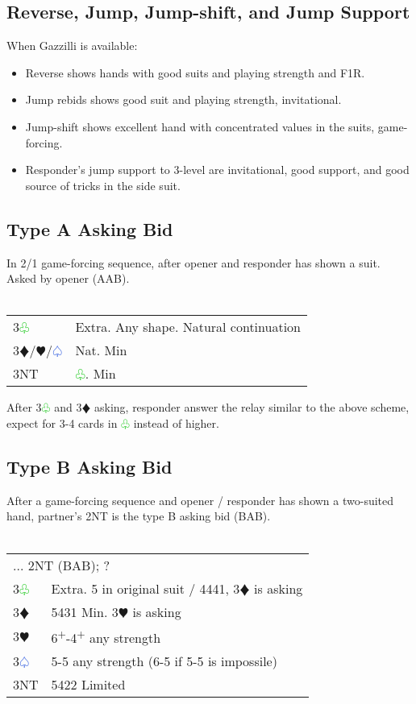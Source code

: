 \documentclass{article}
\renewcommand{\sp}{\textcolor{RoyalBlue}{$\varspade$}}
\newcommand{\he}{\textcolor{RubineRed}{$\varheart$}}
\newcommand{\di}{\textcolor{Peach}{$\vardiamond$}}
\newcommand{\cl}{\textcolor{LimeGreen}{$\varclub$}}
\newcommand{\nt}{\relsize{-1}NT\relsize{1}}
\newcommand{\up}{\textsuperscript{+}}
\begin{document}
\subsection{Reverse, Jump, Jump-shift, and Jump Support}
When Gazzilli is available: 
\begin{itemize}
    \itemsep0em
    \item Reverse shows hands with good suits and playing strength and F1R.
    \item Jump rebids shows good suit and playing strength, invitational.
    \item Jump-shift shows excellent hand with concentrated values in the suits, game-forcing.
    \item Responder's jump support to 3-level are invitational, good support, and good source of tricks in the side suit.
\end{itemize}

\subsection{Type A Asking Bid}
In 2/1 game-forcing sequence, after opener and responder has shown a suit. Asked by opener (AAB). \\\\
\begin{tabular}{|l|p{6.5cm}}
	3\cl{} & Extra. Any shape. Natural continuation \\
	3\di{}/\he{}/\sp{} & Nat. Min \\
	3\nt{} & \cl{}. Min \\
\end{tabular}

\medskip

After 3\cl{} and 3\di{} asking, responder answer the relay similar to the above scheme, expect for 3-4 cards in \cl{} instead of higher.

\subsection{Type B Asking Bid}
After a game-forcing sequence and opener / responder has shown a two-suited hand, partner's 2\nt{} is the type B asking bid (BAB). \\\\
\begin{tabular}{|l|p{6.5cm}}
	\multicolumn{2}{l}{... 2\nt{} (BAB); ? } \\
    3\cl{} & Extra. 5 in original suit / 4441, 3\di{} is asking \\
    3\di{} & 5431 Min. 3\he{} is asking \\
    3\he{}& 6\up{}-4\up{} any strength \\
    3\sp{} & 5-5 any strength (6-5 if 5-5 is impossile) \\
    3\nt & 5422 Limited
\end{tabular}
\end{document}
